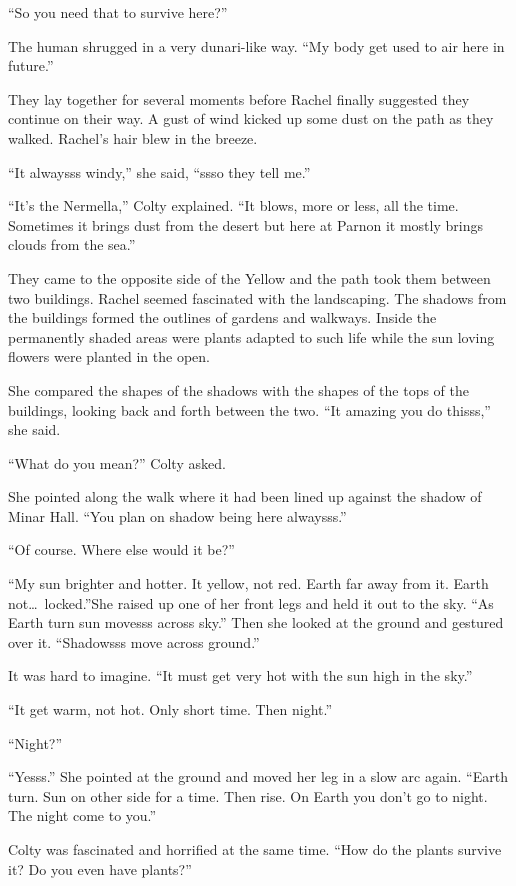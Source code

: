 ``So you need that to survive here?''

The human shrugged in a very dunari-like way. ``My body get used to air here in future.''

They lay together for several moments before Rachel finally suggested they continue on their
way. A gust of wind kicked up some dust on the path as they walked. Rachel's hair blew in the
breeze.

``It alwaysss windy,'' she said, ``ssso they tell me.''

``It's the Nermella,'' Colty explained. ``It blows, more or less, all the time. Sometimes it
brings dust from the desert but here at Parnon it mostly brings clouds from the sea.''

They came to the opposite side of the Yellow and the path took them between two buildings.
Rachel seemed fascinated with the landscaping. The shadows from the buildings formed the
outlines of gardens and walkways. Inside the permanently shaded areas were plants adapted to
such life while the sun loving flowers were planted in the open.

She compared the shapes of the shadows with the shapes of the tops of the buildings, looking
back and forth between the two. ``It amazing you do thisss,'' she said.

``What do you mean?'' Colty asked.

She pointed along the walk where it had been lined up against the shadow of Minar Hall. ``You
plan on shadow being here alwaysss.''

``Of course. Where else would it be?''

``My sun brighter and hotter. It yellow, not red. Earth far away from it. Earth not\ldots\
locked.''She raised up one of her front legs and held it out to the sky. ``As Earth turn sun
movesss across sky.'' Then she looked at the ground and gestured over it. ``Shadowsss move
across ground.''

It was hard to imagine. ``It must get very hot with the sun high in the sky.''

``It get warm, not hot. Only short time. Then night.''

``Night?''

``Yesss.'' She pointed at the ground and moved her leg in a slow arc again. ``Earth turn. Sun on
other side for a time. Then rise. On Earth you don't go to night. The night come to you.''

Colty was fascinated and horrified at the same time. ``How do the plants survive it? Do you even
have plants?''

